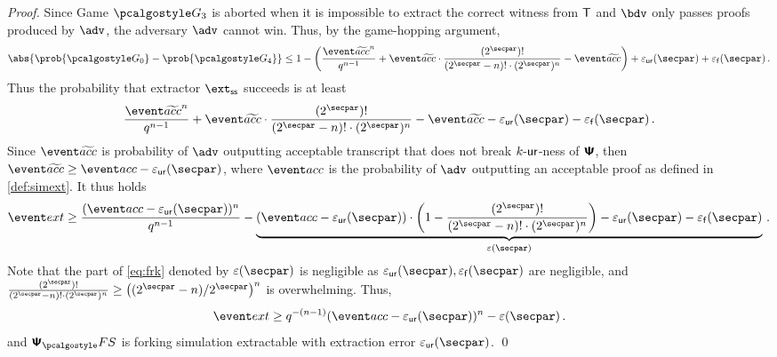 \begin{proof}
		Since Game $\game{3}$ is aborted when it is impossible to extract the correct witness from
		$\mathsf{T}$ and $\bdv$ only passes proofs produced by $\adv$, the adversary $\advse$ cannot
		win. Thus, by the game-hopping argument,
		\[
		\abs{\prob{\game{0}} - \prob{\game{4}}} \leq 1 -
		\left(\frac{\waccProb^{n}}{q^{n - 1}} + \waccProb \cdot \frac{(2^\secpar)
			!}{(2^\secpar - n)! \cdot (2^\secpar)^{n}} - \waccProb\right) + \epsur(\secpar) +
		\epsss(\secpar)\,.
		\]
		Thus the probability that extractor $\extss$ succeeds is at least
		\[
		\frac{\waccProb^{n}}{q^{n - 1}} + \waccProb \cdot \frac{(2^\secpar)
			!}{(2^\secpar - n)! \cdot (2^\secpar)^{n}} - \waccProb - \epsur(\secpar) 
		- \epsss(\secpar)\,.
		\]
		Since $\waccProb$ is probability of $\advse$ outputting acceptable transcript
		that does not break ${k\text{-}\mathsf{ur}}$-ness of $\bm{\mathsf{\Psi}}$, then $\waccProb \geq \accProb -
		\epsur(\secpar)$, where $\accProb$ is the probability of $\advse$ outputting an acceptable
		proof as defined in \cref{def:simext}. It thus holds
		\begin{equation}
		\label{eq:frk}
		\extProb \geq \frac{(\accProb - \epsur(\secpar))^{n}}{q^{n - 1}} -
		\underbrace{(\accProb - \epsur(\secpar)) \cdot \left( 1 - \frac{(2^\secpar)
				!}{(2^\secpar - n)! \cdot (2^\secpar)^{n}}\right) - \epsur(\secpar) -
			\epsss(\secpar)}_{\eps(\secpar)}\,.
		\end{equation}
		Note that the part of \cref{eq:frk} denoted by $\eps(\secpar)$ is negligible as
		$\epsur(\secpar), \epsss(\secpar)$ are negligible, and
		$\frac{(2^\secpar) !}{(2^\secpar - n)! \cdot (2^\secpar)^{n}} \geq
		\left(\infrac{(2^\secpar - n)}{2^\secpar}\right)^{n}$ is overwhelming.  Thus,
		\[
		\extProb \geq q^{-(n - 1)} (\accProb - \epsur(\secpar))^{n} -\eps(\secpar)\,.
		\] 
		and $\psfs$ is forking simulation extractable with extraction error $\epsur(\secpar)$.
	\qed
\end{proof}